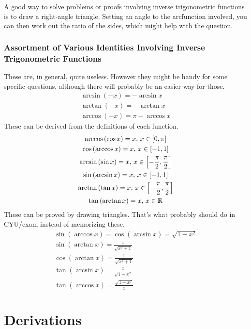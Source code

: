 \documentclass{article}
\begin{document}
A good way to solve problems or proofs involving inverse
trigonometric functions is to draw a right-angle triangle. Setting
an angle to the arcfunction involved, you can then work out the
ratio of the sides, which might help with the question.

\subsubsection{Assortment of Various Identities Involving Inverse
Trigonometric Functions}
These are, in general, quite useless. However they might be handy
for some specific questions, although there will probably be an
easier way for those.
\begin{gather*}
	\arcsin\left(-x\right)=-\arcsin x \\
	\arctan\left(-x\right)=-\arctan x \\
	\arccos\left(-x\right)=\pi-\arccos x
\end{gather*}
These can be derived from the definitions of each function.
\begin{gather*}
	\arccos\left(\cos x\right)=x,\,x\in\interval[scaled]{0}{\pi} \\
	\cos\left(\arccos x\right)=x,\,x\in\interval[scaled]{-1}{1} \\
	\arcsin\left(\sin x\right)=x,\,x\in\interval[scaled]
		{-\frac{\pi}{2}}{\frac{\pi}{2}} \\
	\sin\left(\arcsin x\right)=x,\,x\in\interval[scaled]{-1}{1} \\
	\arctan\left(\tan x\right)=x,\,x\in\interval[scaled]
		{-\frac{\pi}{2}}{\frac{\pi}{2}} \\
	\tan\left(\arctan x\right)=x,\,x\in\mathbb{R}
\end{gather*}
These can be proved by drawing triangles. That's what probably
should do in CYU/exam instead of memorizing these.
\begin{gather*}
	\sin\left(\arccos x\right)=
	\cos\left(\arcsin x\right)=\sqrt{1-x^2} \\
	\sin\left(\arctan x\right)=\frac{x}{\sqrt{x^2+1}} \\
	\cos\left(\arctan x\right)=\frac{1}{\sqrt{x^2+1}} \\
	\tan\left(\arcsin x\right)=\frac{x}{\sqrt{1-x^2}} \\
	\tan\left(\arccos x\right)=\frac{\sqrt{1-x^2}}{x}
\end{gather*}


\pagebreak
\section{Derivations}
\end{document}
